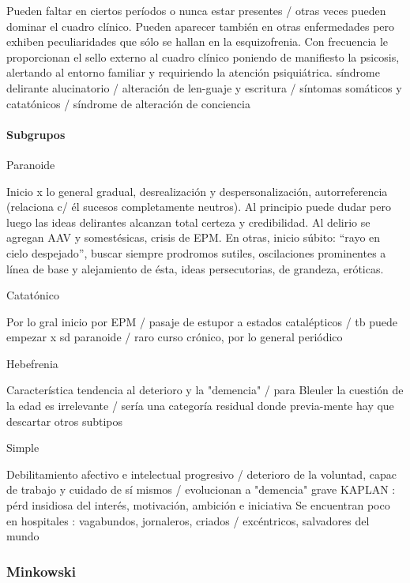 Pueden faltar en ciertos períodos o nunca estar presentes / otras veces pueden dominar el cuadro clínico. Pueden aparecer también en otras enfermedades pero exhiben peculiaridades que sólo se hallan en la esquizofrenia. Con frecuencia le proporcionan el sello externo al cuadro clínico poniendo de manifiesto la psicosis, alertando al entorno familiar y requiriendo la atención psiquiátrica. síndrome delirante alucinatorio / alteración de len-guaje y escritura / síntomas somáticos y catatónicos / síndrome de alteración de conciencia

\paragraph*{Subgrupos}

Paranoide

Inicio x lo general gradual, desrealización y despersonalización, autorreferencia (relaciona c/ él sucesos completamente neutros). Al principio puede dudar pero luego las ideas delirantes alcanzan total certeza y credibilidad. Al delirio se agregan AAV y somestésicas, crisis de EPM. En otras, inicio súbito: “rayo en cielo despejado”, buscar siempre prodromos sutiles, oscilaciones prominentes a línea de base y alejamiento de ésta, ideas persecutorias, de grandeza, eróticas.

Catatónico

Por lo gral inicio por EPM / pasaje de estupor a estados catalépticos / tb puede empezar x sd paranoide / raro curso crónico, por lo general periódico

Hebefrenia

Característica tendencia al deterioro y la "demencia" / para Bleuler la cuestión de la edad es irrelevante / sería una categoría residual donde previa-mente hay que descartar otros subtipos

Simple

Debilitamiento afectivo e intelectual progresivo / deterioro de la voluntad, capac de trabajo y cuidado de sí mismos / evolucionan a "demencia" grave KAPLAN : pérd insidiosa del interés, motivación, ambición e iniciativa Se encuentran poco en hospitales : vagabundos, jornaleros, criados / excéntricos, salvadores del mundo

\subsubsection*{Minkowski}

